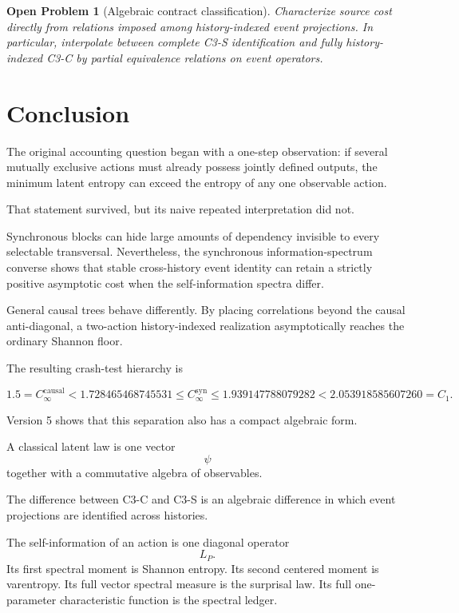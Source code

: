 \documentclass[11pt,a4paper]{article}
\newtheorem{problem}[theorem]{Open Problem}
\newcommand{\CinfSyn}{C_{\infty}^{\mathrm{syn}}}
\newcommand{\CinfCausal}{C_{\infty}^{\mathrm{causal}}}
\newcommand{\1}{\mathbf 1}
\begin{document}
\begin{problem}[Algebraic contract classification]
Characterize source cost directly from relations imposed among
history-indexed event projections.
In particular, interpolate between complete C3-S identification and
fully history-indexed C3-C by partial equivalence relations on event
operators.
\end{problem}


\section{Conclusion}

The original accounting question began with a one-step observation:
if several mutually exclusive actions must already possess jointly
defined outputs, the minimum latent entropy can exceed the entropy of
any one observable action.

That statement survived, but its naive repeated interpretation did not.

Synchronous blocks can hide large amounts of dependency invisible to
every selectable transversal.
Nevertheless, the synchronous information-spectrum converse shows that
stable cross-history event identity can retain a strictly positive
asymptotic cost when the self-information spectra differ.

General causal trees behave differently.
By placing correlations beyond the causal anti-diagonal, a two-action
history-indexed realization asymptotically reaches the ordinary Shannon
floor.

The resulting crash-test hierarchy is

\[
\boxed{
1.5
=
\CinfCausal
<
1.728465468745531
\le
\CinfSyn
\le
1.939147788079282
<
2.053918585607260
=
C_1.
}
\tag{46.1}
\]

Version 5 shows that this separation also has a compact algebraic form.

A classical latent law is one vector
\[
\psi
\]
together with a commutative algebra of observables.

The difference between C3-C and C3-S is an algebraic difference in which
event projections are identified across histories.

The self-information of an action is one diagonal operator
\[
L_P.
\]
Its first spectral moment is Shannon entropy.
Its second centered moment is varentropy.
Its full vector spectral measure is the surprisal law.
Its full one-parameter characteristic function is the spectral ledger.
\end{document}
